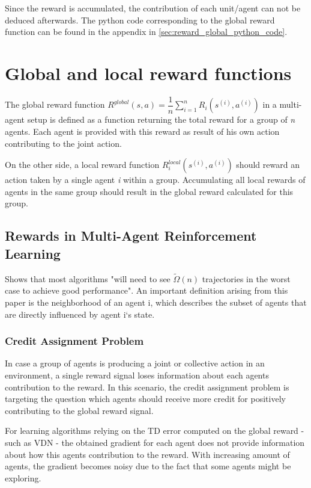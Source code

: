 Since the reward is accumulated, the contribution of each unit/agent can not be deduced afterwards. The python code corresponding to the global reward function can be found in the appendix in \autoref{sec:reward_global_python_code}.

\section{Global and local reward functions}\label{sec:global_local_r_function}
The global reward function $R^{global}(s, a)=\dfrac{1}{n} \sum_{i=1}^{n} R_i\left(s^{(i)}, a^{(i)}\right)$ in a multi-agent setup is defined as a function returning the total reward for a group of \textit{n} agents. Each agent is provided with this reward as result of his own action contributing to the joint action.

On the other side, a local reward function $R_{i}^{local}\left(s^{(i)}, a^{(i)}\right)$ should reward an action taken by a single agent \textit{i} within a group. Accumulating all local rewards of agents in the same group should result in the global reward calculated for this group. \cite{NIPS2005_2951}

\subsection{Rewards in Multi-Agent Reinforcement Learning}
\cite{NIPS2005_2951} Shows that most algorithms "will need to see $\tilde{\Omega}(n)$ trajectories in the worst case to achieve good performance". An important definition arising from this paper is the neighborhood of an agent i, which describes the subset of agents that are directly influenced by agent i`s state.

\subsubsection{Credit Assignment Problem}
In case a group of agents is producing a joint or collective action in an environment, a single reward signal loses information about each agents contribution to the reward. In this scenario, the credit assignment problem is targeting the question which agents should receive more credit for positively contributing to the global reward signal. \cite{sutton2018reinforcement}

For learning algorithms relying on the TD error computed on the global reward - such as VDN - the obtained gradient for each agent does not provide information about how this agents contribution to the reward. With increasing amount of agents, the gradient becomes noisy due to the fact that some agents might be exploring.
\cite{foerster2018counterfactual}

